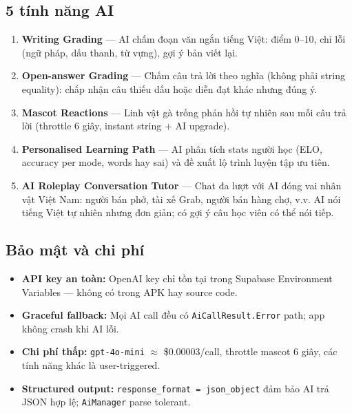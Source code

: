 \documentclass[12pt,a4paper]{article}
\begin{document}
\subsection{5 tính năng AI}

\begin{enumerate}
  \item \textbf{Writing Grading} — AI chấm đoạn văn ngắn tiếng Việt: điểm 0–10, chỉ lỗi
        (ngữ pháp, dấu thanh, từ vựng), gợi ý bản viết lại.
  \item \textbf{Open-answer Grading} — Chấm câu trả lời theo nghĩa (không phải string
        equality): chấp nhận câu thiếu dấu hoặc diễn đạt khác nhưng đúng ý.
  \item \textbf{Mascot Reactions} — Linh vật gà trống phản hồi tự nhiên sau mỗi câu
        trả lời (throttle 6 giây, instant string + AI upgrade).
  \item \textbf{Personalised Learning Path} — AI phân tích stats người học
        (ELO, accuracy per mode, words hay sai) và đề xuất lộ trình luyện tập ưu tiên.
  \item \textbf{AI Roleplay Conversation Tutor} — Chat đa lượt với AI đóng vai
        nhân vật Việt Nam: người bán phở, tài xế Grab, người bán hàng chợ, v.v.
        AI nói tiếng Việt tự nhiên nhưng đơn giản; có gợi ý câu học viên có thể nói tiếp.
\end{enumerate}

\subsection{Bảo mật và chi phí}

\begin{itemize}
  \item \textbf{API key an toàn:} OpenAI key chỉ tồn tại trong Supabase Environment Variables —
        không có trong APK hay source code.
  \item \textbf{Graceful fallback:} Mọi AI call đều có \texttt{AiCallResult.Error} path;
        app không crash khi AI lỗi.
  \item \textbf{Chi phí thấp:} \texttt{gpt-4o-mini} $\approx$ \$0.00003/call, throttle
        mascot 6 giây, các tính năng khác là user-triggered.
  \item \textbf{Structured output:} \texttt{response\_format = json\_object} đảm bảo
        AI trả JSON hợp lệ; \texttt{AiManager} parse tolerant.
\end{itemize}

\end{document}
